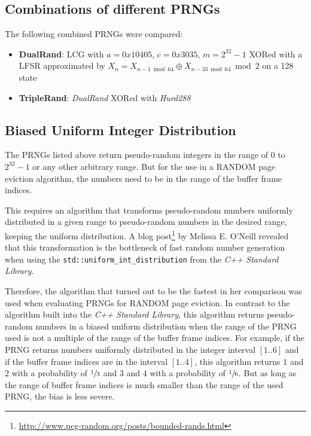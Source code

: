 \subsection[Combinations of different PRNGs]{Combinations of different PRNGs} \label{subsec:combination}

    The following combined PRNGs were compared:
    \begin{itemize}
        \itemsep0em
        \item \textbf{DualRand}: LCG with $a = 0x10405$, $c = 0x3035$, $m = 2^{32} - 1$ XORed with a LFSR approximated by $X_n = X_{n - 1 \bmod 64} \oplus X_{n - 33 \bmod 64} \bmod 2$ on a \SI{128}{\bit} state
        \item \textbf{TripleRand}: \textit{DualRand} XORed with \textit{Hurd288}
    \end{itemize}

\subsection[Biased Uniform Int Distribution]{Biased Uniform Integer Distribution} \label{subsec:distribution}

    The PRNGs listed above return pseudo-random integers in the range of $0$ to $2^{32} - 1$ or any other arbitrary range. But for the use in a RANDOM page eviction algorithm, the numbers need to be in the range of the buffer frame indices.

    This requires an algorithm that transforms pseudo-random numbers uniformly distributed in a given range to pseudo-random numbers in the desired range, keeping the uniform distribution. A blog post\footnote{\url{http://www.pcg-random.org/posts/bounded-rands.html}} by Melissa E. O'Neill revealed that this transformation is the bottleneck of fast random number generation when using the \lstinline|std::uniform_int_distribution| from the \textit{C++ Standard Library}.

    Therefore, the algorithm that turned out to be the fastest in her comparison was used when evaluating PRNGs for RANDOM page eviction. In contrast to the algorithm built into the \textit{C++ Standard Library}, this algorithm returns pseudo-random numbers in a biased uniform distribution when the range of the PRNG used is not a multiple of the range of the buffer frame indices. For example, if the PRNG returns numbers uniformly distributed in the integer interval $\left[1 .. 6\right]$ and if the buffer frame indices are in the interval $\left[1 .. 4\right]$, this algorithm returns $1$ and $2$ with a probability of $\sfrac{1}{3}$ and $3$ and $4$ with a probability of $\sfrac{1}{6}$. But as long as the range of buffer frame indices is much smaller than the range of the used PRNG, the bias is less severe.

